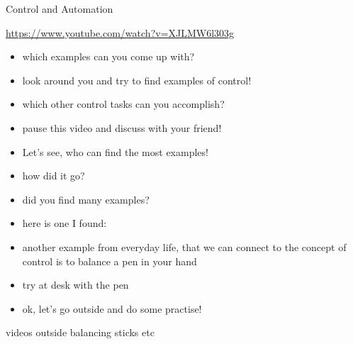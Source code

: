 \begin{frame}{Control and Automation}
	\begin{center}
		\url{https://www.youtube.com/watch?v=XJLMW6l303g} \vspace{0.2cm} \\
	\end{center}
\end{frame}


\begin{frame}
	\begin{itemize}
		\item which examples can you come up with?
		\item look around you and try to find examples of control!
		\item which other control tasks can you accomplish?
		\item pause this video and discuss with your friend!
		\item Let's see, who can find the most examples!
	\end{itemize}
\end{frame}

\begin{frame}
	\begin{itemize}
		\item how did it go?
		\item did you find many examples?
		\item here is one I found: 
		\item another example from everyday life, that we can connect to the concept of control is to balance a pen in your hand
		\item try at desk with the pen
		\item ok, let's go outside and do some practise!
	\end{itemize}
\end{frame}

\begin{frame}
	videos outside balancing sticks etc
	\end{frame}
	

